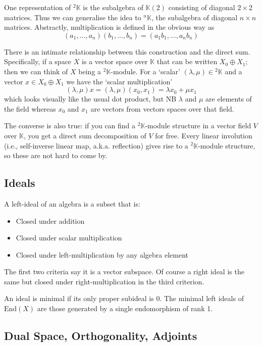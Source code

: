 \documentclass[oneside,english]{amsbook}
\numberwithin{section}{chapter}
\theoremstyle{plain}
\theoremstyle{definition}
\begin{document}
One representation of ${}^2\mathbb{K}$ is the subalgebra of $\mathbb{K}(2)$ consisting of diagonal $2\times 2$ matrices. Thus we can generalise the idea to ${}^n\mathbb{K}$, the subalgebra of diagonal $n\times n$ matrices. Abstractly, multiplication is defined in the obvious way as
\[
	(a_1,...,a_n)(b_1, ..., b_n) = (a_1b_1,...,a_nb_n)
\]

There is an intimate relationship between this construction and the direct sum. Specifically, if a space $X$ is a vector space over $\mathbb{K}$ that can be written $X_0\oplus X_1$; then we can think of $X$ being a ${}^2\mathbb{K}$-module. For a `scalar' $(\lambda, \mu)\in {}^2\mathbb{K}$ and a vector $x\in X_0\oplus X_1$ we have the `scalar multiplication'
\[
	(\lambda, \mu)x =(\lambda, \mu)(x_0, x_1) = \lambda x_0 + \mu x_1
\]
which looks visually like the usual dot product, but NB $\lambda$ and $\mu$ are elements of the field whereas $x_0$ and $x_1$ are vectors from vectors spaces over that field.
 
The converse is also true: if you can find a ${}^2\mathbb{K}$-module structure in a vector field $V$ over $\mathbb{K}$, you get a direct sum decomposition of $V$ for free. Every linear involution (i.e., self-inverse linear map, a.k.a. reflection) gives rise to a ${}^2\mathbb{K}$-module structure, so these are not hard to come by.

\subsection{Ideals}

A left-ideal of an algebra is a subset that is:
\begin{itemize}
	\item Closed under addition
	\item Closed under scalar multiplication
	\item Closed under left-multiplication by any algebra element
\end{itemize}
The first two criteria say it is a vector subspace. Of course a right ideal is the same but closed under right-multiplication in the third criterion.

An ideal is minimal if its only proper subideal is ${0}$. The minimal left ideals of $\text{End}(X)$ are those generated by a single endomorphism of rank 1.

\subsection{Dual Space, Orthogonality, Adjoints}
\end{document}
